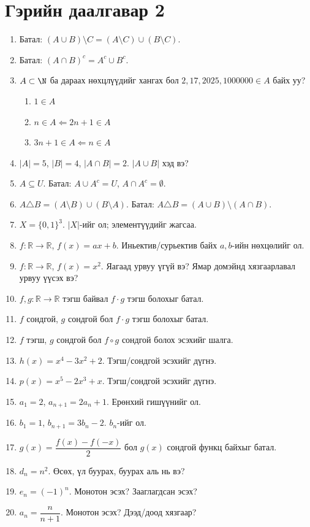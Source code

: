 \newpage
\section*{Гэрийн даалгавар 2 }
\begin{enumerate}
  \item Батал: $(A\cup B)\setminus C=(A\setminus C)\cup(B\setminus C)$.
  \item Батал: $(A\cap B)^c=A^c\cup B^c$.
  \item $A\subset \N$ ба дараах нөхцлүүдийг хангах бол $2, 17, 2025, 1000000\in A$ байх уу?
  \begin{enumerate}
      \item $1\in A$
      \item $n\in A\Leftarrow 2n+1\in A$
      \item $3n+1\in A\Leftarrow n\in A$
  \end{enumerate}
  \item $|A|=5$, $|B|=4$, $|A\cap B|=2$. $|A\cup B|$ хэд вэ?
  \item $A\subseteq U$. Батал: $A\cup A^c=U$, $A\cap A^c=\emptyset$.
  \item $A\triangle B=(A\setminus B)\cup(B\setminus A)$. Батал: $A\triangle B=(A\cup B)\setminus(A\cap B)$.
  \item $X=\{0,1\}^3$. $|X|$-ийг ол; элементүүдийг жагсаа.
  \item $f:\mathbb{R}\to\mathbb{R}$, $f(x)=ax+b$. Иньектив/сурьектив байх $a,b$-ийн нөхцөлийг ол.
  \item $f:\mathbb{R}\to\mathbb{R}$, $f(x)=x^2$. Яагаад урвуу үгүй вэ? Ямар домэйнд хязгаарлавал урвуу үүсэх вэ?
  \item $f,g:\mathbb{R}\to\mathbb{R}$ тэгш байвал $f\cdot g$ тэгш болохыг батал.
  \item $f$ сондгой, $g$ сондгой бол $f\cdot g$ тэгш болохыг батал.
  \item $f$ тэгш, $g$ сондгой бол $f\circ g$ сондгой болох эсэхийг шалга.
  \item $h(x)=x^4-3x^2+2$. Тэгш/сондгой эсэхийг дүгнэ.
  \item $p(x)=x^5-2x^3+x$. Тэгш/сондгой эсэхийг дүгнэ.
  \item $a_1=2$, $a_{n+1}=2a_n+1$. Ерөнхий гишүүнийг ол.
  \item $b_1=1$, $b_{n+1}=3b_n-2$. $b_n$-ийг ол.
  \item $g(x)=\dfrac{f(x)-f(-x)}{2}$ бол $g(x)$ сондгой функц байхыг батал.
  \item $d_n=n^2$. Өсөх, үл буурах, буурах аль нь вэ?
  \item $e_n=(-1)^n$. Монотон эсэх? Зааглагдсан эсэх?
  \item $a_n=\dfrac{n}{n+1}$. Монотон эсэх? Дээд/доод хязгаар?
\end{enumerate}
